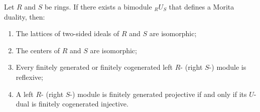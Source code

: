 Let $R$ and $S$ be rings. If there exists a bimodule ${}_R U_S$ that defines a Morita duality, then:

\begin{enumerate}
\item[(1)] The lattices of two-sided ideals of $R$ and $S$ are isomorphic;
\item[(2)] The centers of $R$ and $S$ are isomorphic;
\item[(3)] Every finitely generated or finitely cogenerated left $R$- (right $S$-) module is reflexive;
\item[(4)] A left $R$- (right $S$-) module is finitely generated projective if and only if its $U$-dual is finitely cogenerated injective.
\end{enumerate}
